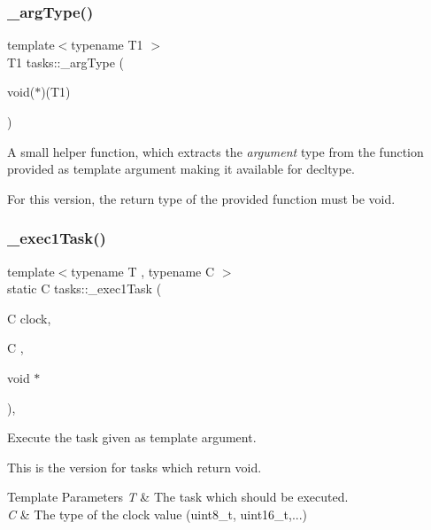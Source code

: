 \subsubsection{\texorpdfstring{\+\_\+arg\+Type()}{\_argType()}\hspace{0.1cm}{\footnotesize\ttfamily [2/2]}}
{\footnotesize\ttfamily template$<$typename T1 $>$ \\
T1 tasks\+::\+\_\+arg\+Type (\begin{DoxyParamCaption}\item[{void($\ast$)(T1)}]{ }\end{DoxyParamCaption})}



A small helper function, which extracts the {\itshape argument} type from the function provided as template argument making it available for decltype. 

For this version, the return type of the provided function must be void. \hypertarget{namespacetasks_acc347173bd59f335faea1d7f1fcae0eb}{}\label{namespacetasks_acc347173bd59f335faea1d7f1fcae0eb} 
\subsubsection{\texorpdfstring{\+\_\+exec1\+Task()}{\_exec1Task()}\hspace{0.1cm}{\footnotesize\ttfamily [1/2]}}
{\footnotesize\ttfamily template$<$typename T , typename C $>$ \\
static C tasks\+::\+\_\+exec1\+Task (\begin{DoxyParamCaption}\item[{C}]{clock,  }\item[{C}]{,  }\item[{void $\ast$}]{ }\end{DoxyParamCaption})\hspace{0.3cm}{\ttfamily [inline]}, {\ttfamily [static]}}



Execute the task given as template argument. 

This is the version for tasks which return void.


\begin{DoxyTemplParams}{Template Parameters}
{\em T} & The task which should be executed. \\
\hline
{\em C} & The type of the clock value (uint8\+\_\+t, uint16\+\_\+t,...) \\
\hline
\end{DoxyTemplParams}

